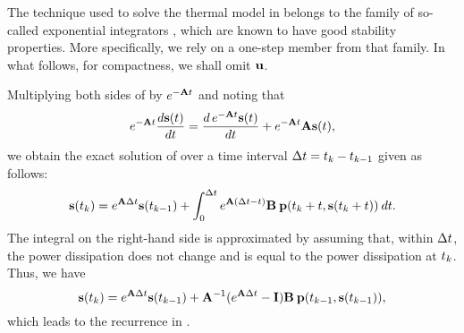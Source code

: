 The technique used to solve the thermal model in  belongs to the family of so-called exponential integrators \cite{hochbruck2010}, which are known to have good stability properties.
More specifically, we rely on a one-step member from that family.
In what follows, for compactness, we shall omit $\mathbf{u}$.

Multiplying both sides of  by $e^{- \mathbf{A} t}$ and noting that
\[
  e^{-\mathbf{A} t} \frac{d\mathbf{s}(t)}{dt} = \frac{d\, e^{-\mathbf{A} t} \mathbf{s}(t)}{dt} + e^{-\mathbf{A} t} \mathbf{A} \mathbf{s}(t),
\]
we obtain the exact solution of  over a time interval $\Delta t = t_k - t_{k - 1}$ given as follows:
\[
  \mathbf{s}(t_k) = e^{\mathbf{A} \Delta t} \mathbf{s}(t_{k - 1}) + \int_0^{\Delta t} e^{\mathbf{A} (\Delta t - t)} \mathbf{B} \: \mathbf{p}(t_k + t, \mathbf{s}(t_k + t)) \: dt.
\]
The integral on the right-hand side is approximated by assuming that, within $\Delta t$, the power dissipation does not change and is equal to the power dissipation at $t_k$.
Thus, we have
\[
  \mathbf{s}(t_k) = e^{\mathbf{A} \Delta t} \mathbf{s}(t_{k - 1}) + \mathbf{A}^{-1}(e^{\mathbf{A} \Delta t} - \mathbf{I}) \mathbf{B} \: \mathbf{p}(t_{k - 1}, \mathbf{s}(t_{k - 1})),
\]
which leads to the recurrence in .
